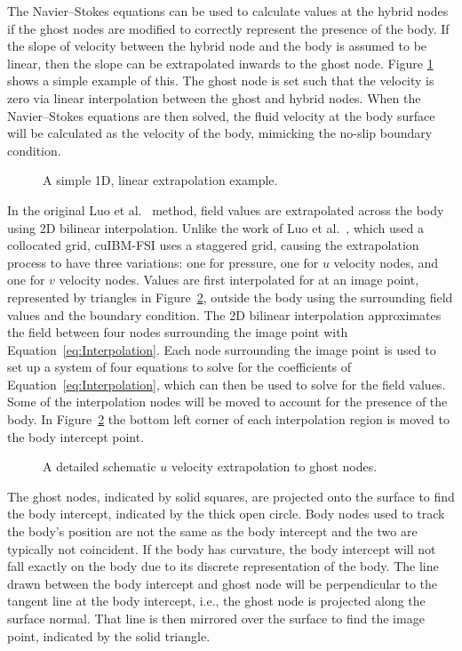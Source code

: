 The Navier--Stokes equations can be used to calculate values at the hybrid nodes if the ghost nodes are modified to correctly represent the presence of the body. 
If the slope of velocity between the hybrid node and the body is assumed to be linear, then the slope can be extrapolated inwards to the ghost node. 
Figure \ref{Fig: Simple Interpolation} shows a simple example of this. 
The ghost node is set such that the velocity is zero via linear interpolation between the ghost and hybrid nodes. 
When the Navier--Stokes equations are then solved, the fluid velocity at the body surface will be calculated as the velocity of the body, mimicking the no-slip boundary condition. 
\begin{figure}[!htb]
	\centering
	
	\caption{A simple 1D, linear extrapolation example.}
	\label{Fig: Simple Interpolation}
\end{figure}
In the original Luo et al.~\cite{Luo:2012gx} method, field values are extrapolated across the body using 2D bilinear interpolation. 
Unlike the work of Luo et al.~\cite{Luo:2012gx}, which used a collocated grid, cuIBM-FSI uses a staggered grid, causing the extrapolation process to have three variations: one for pressure, one for $u$ velocity nodes, and one for $v$ velocity nodes. 
Values are first interpolated for at an image point, represented by triangles in Figure~\ref{fig:Ghost node extrapolation}, outside the body using the surrounding field values and the boundary condition. 
The 2D bilinear interpolation approximates the field between four nodes surrounding the image point with Equation~\eqref{eq:Interpolation}. 
Each node surrounding the image point is used to set up a system of four equations to solve for the coefficients of Equation~\eqref{eq:Interpolation}, which can then be used to solve for the field values. 
Some of the interpolation nodes will be moved to account for the presence of the body.
In Figure~\ref{fig:Ghost node extrapolation} the bottom left corner of each interpolation region is moved to the body intercept point.
\begin{figure}[!htb]
	\centering
	
	\caption{A detailed schematic $u$ velocity extrapolation to ghost nodes.}
	\label{fig:Ghost node extrapolation}
\end{figure}

The ghost nodes, indicated by solid squares, are projected onto the surface to find the body intercept, indicated by the thick open circle. 
Body nodes used to track the body's position are not the same as the body intercept and the two are typically not coincident. 
If the body has curvature, the body intercept will not fall exactly on the body due to its discrete representation of the body. 
The line drawn between the body intercept and ghost node will be perpendicular to the tangent line at the body intercept, i.e., the ghost node is projected along the surface normal. 
That line is then mirrored over the surface to find the image point, indicated by the solid triangle. 


